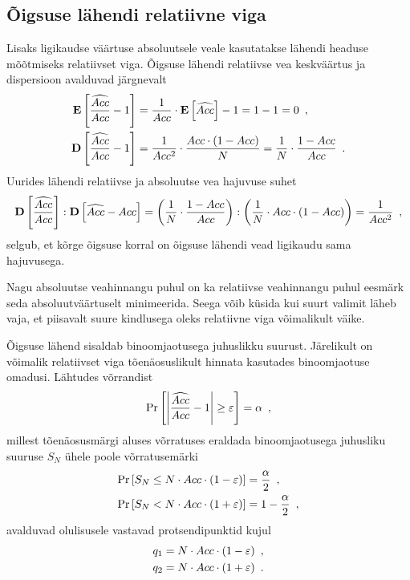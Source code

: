 \subsection{Õigsuse lähendi relatiivne viga}
Lisaks ligikaudse väärtuse absoluutsele veale kasutatakse lähendi headuse mõõtmiseks relatiivset viga. Õigsuse lähendi relatiivse vea keskväärtus ja dispersioon avalduvad järgnevalt
\begin{align*}
    \operatorname*{\mathbf{E}}\left[\frac{\widehat{Acc}}{Acc}-1\right]&=\frac{1}{Acc}\cdot\operatorname*{\mathbf{E}}\left[\widehat{Acc}\right]-1=1-1=0 \nonumber\enspace, \\
    \operatorname*{\mathbf{D}}\left[\frac{\widehat{Acc}}{Acc}-1\right]&=\frac{1}{Acc^2}\cdot\frac{Acc\cdot(1-Acc)}{N}=\frac{1}{N}\cdot\frac{1-Acc}{Acc} \enspace.
\end{align*}
Uurides lähendi relatiivse ja absoluutse vea hajuvuse suhet
\begin{equation*}
    \operatorname*{\mathbf{D}}\left[\frac{\widehat{Acc}}{Acc}\right] : \operatorname*{\mathbf{D}}\left[\widehat{Acc}-Acc\right]=
    \left( \frac{1}{N}\cdot\frac{1-Acc}{Acc} \right) : \left( \frac{1}{N}\cdot Acc\cdot(1-Acc) \right)=\frac{1}{Acc^2} \enspace,
\end{equation*}
selgub, et kõrge õigsuse korral on õigsuse lähendi vead ligikaudu sama hajuvusega.

Nagu absoluutse veahinnangu puhul on ka relatiivse veahinnangu puhul eesmärk seda absoluutväärtuselt minimeerida. Seega võib küsida kui suurt valimit läheb vaja, et piisavalt suure kindlusega oleks relatiivne viga võimalikult väike.

Õigsuse lähend sisaldab binoomjaotusega juhuslikku suurust. Järelikult on võimalik relatiivset viga tõenäosuslikult hinnata kasutades binoomjaotuse omadusi. Lähtudes võrrandist
\begin{equation}
    \label{eq:binoomjaotus relatiivne viga}
    \Pr\left[\left|\frac{\widehat{Acc}}{Acc}-1\right|\geq\varepsilon\right]=\alpha \enspace,
\end{equation}
millest tõenäosusmärgi aluses võrratuses eraldada binoomjaotusega juhusliku suuruse $S_N$ ühele poole võrratusemärki
\begin{align*}
    \Pr\left[S_N \leq N \cdot Acc \cdot (1-\varepsilon)\right] &= \frac{\alpha}{2} \enspace, \\
    \Pr\left[S_N <    N \cdot Acc \cdot (1+\varepsilon)\right] &= 1 - \frac{\alpha}{2} \enspace,
\end{align*}
avalduvad olulisusele vastavad protsendipunktid kujul
\begin{align*}
    q_1 &= N \cdot Acc \cdot (1-\varepsilon) \enspace, \\
    q_2 &= N \cdot Acc \cdot (1+\varepsilon) \enspace.
\end{align*}


